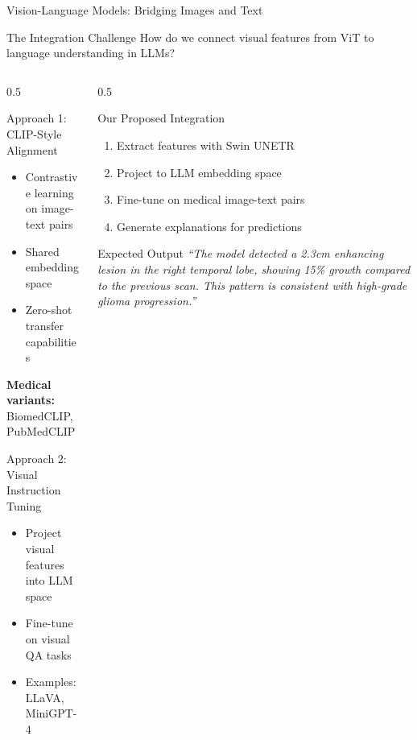 \documentclass[aspectratio=169]{beamer}
\begin{document}
\begin{frame}{Vision-Language Models: Bridging Images and Text}
    \begin{block}{The Integration Challenge}
        How do we connect visual features from ViT to language understanding in LLMs?
    \end{block}
    
    \begin{columns}
        \begin{column}{0.5\textwidth}
            \begin{block}{Approach 1: CLIP-Style Alignment}
                \begin{itemize}
                    \item Contrastive learning on image-text pairs
                    \item Shared embedding space
                    \item Zero-shot transfer capabilities
                \end{itemize}
                \textbf{Medical variants:} BiomedCLIP, PubMedCLIP
            \end{block}
            
            \begin{block}{Approach 2: Visual Instruction Tuning}
                \begin{itemize}
                    \item Project visual features into LLM space
                    \item Fine-tune on visual QA tasks
                    \item Examples: LLaVA, MiniGPT-4
                \end{itemize}
            \end{block}
        \end{column}
        \begin{column}{0.5\textwidth}
            \begin{block}{Our Proposed Integration}
                \begin{enumerate}
                    \item Extract features with Swin UNETR
                    \item Project to LLM embedding space
                    \item Fine-tune on medical image-text pairs
                    \item Generate explanations for predictions
                \end{enumerate}
            \end{block}
            
            \begin{alertblock}{Expected Output}
                \textit{``The model detected a 2.3cm enhancing lesion in the right temporal lobe, showing 15\% growth compared to the previous scan. This pattern is consistent with high-grade glioma progression.''}
            \end{alertblock}
        \end{column}
    \end{columns}
\end{frame}
\end{document}
